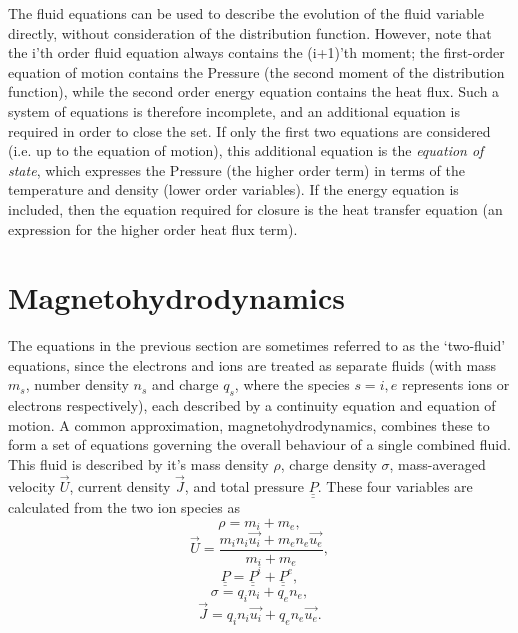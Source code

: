 The fluid equations can be used to describe the evolution of the fluid variable directly, without consideration of the distribution function. However, note that the i'th order fluid equation always contains the (i+1)'th moment; the first-order equation of motion contains the Pressure (the second moment of the distribution function), while the second order energy equation contains the heat flux. Such a system of equations is therefore incomplete, and an additional equation is required in order to close the set. If only the first two equations are considered (i.e. up to the equation of motion), this additional equation is the \textit{equation of state}, which expresses the Pressure (the higher order term) in terms of the temperature and density (lower order variables). If the energy equation is included, then the equation required for closure is the heat transfer equation (an expression for the higher order heat flux term).

\section{Magnetohydrodynamics}
The equations in the previous section are sometimes referred to as the `two-fluid' equations, since the electrons and ions are treated as separate fluids (with mass $m_s$, number density $n_s$ and charge $q_s$, where the species $s = i,e$ represents ions or electrons respectively), each described by a continuity equation and equation of motion. A common approximation, magnetohydrodynamics, combines these to form a set of equations governing the overall behaviour of a single combined fluid. This fluid is described by it's mass density $\rho$, charge density $\sigma$, mass-averaged velocity $\vec{U}$, current density $\vec{J}$, and total pressure $\underline{\underline{P}}$. These four variables are calculated from the two ion species as
\begin{equation} \rho = m_i + m_e,  \end{equation}
\begin{equation} \vec{U} = \frac{m_i n_i \vec{u_i} + m_e n_e \vec{u_e}}{ m_i + m_e},  \end{equation}
\begin{equation} \underline{\underline{P}} = \underline{\underline{P}}^i + \underline{\underline{P}}^e,  \end{equation}
\begin{equation} \sigma = q_i n_i + q_e n_e,  \end{equation}
\begin{equation} \vec{J} = q_i n_i \vec{u_i} + q_e n_e \vec{u_e}.  \end{equation}

